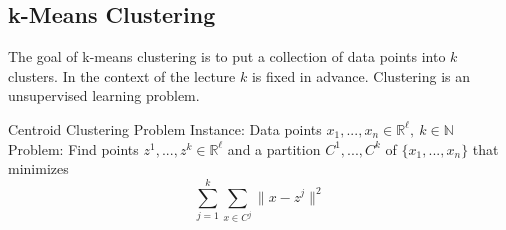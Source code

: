 \documentclass[english]{panikzettel}
\begin{document}
%
%
%

\subsection{k-Means Clustering}
The goal of k-means clustering is to put a collection of data points into $k$ clusters. In the context of the lecture $k$ is fixed in advance. Clustering is an unsupervised learning problem.

\begin{defi}{Centroid Clustering Problem}
Instance: Data points $x_1,..., x_n\in\mathbb{R}^\ell, \ k\in\mathbb{N}$ \\
Problem:  Find points $z^1,...,z^k\in\mathbb{R}^\ell$ and a partition $C^1,...,C^k$ of $\{x_1,...,x_n \}$ that minimizes
\[
\sum_{j=1}^k \sum_{x\in C^j} \parallel x-z^j \parallel^2
\]
\end{defi}
\end{document}
